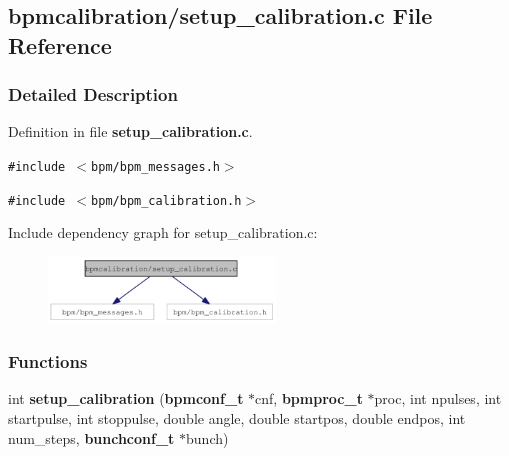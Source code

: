 \subsection{bpmcalibration/setup\_\-calibration.c File Reference}
\label{setup__calibration_8c}


\subsubsection{Detailed Description}


Definition in file {\bf setup\_\-calibration.c}.

{\tt \#include $<$bpm/bpm\_\-messages.h$>$}\par
{\tt \#include $<$bpm/bpm\_\-calibration.h$>$}\par


Include dependency graph for setup\_\-calibration.c:\nopagebreak
\begin{figure}[H]
\begin{center}
\leavevmode
\includegraphics[width=171pt]{setup__calibration_8c__incl}
\end{center}
\end{figure}
\subsubsection*{Functions}
\begin{CompactItemize}
\item 
int {\bf setup\_\-calibration} ({\bf bpmconf\_\-t} $\ast$cnf, {\bf bpmproc\_\-t} $\ast$proc, int npulses, int startpulse, int stoppulse, double angle, double startpos, double endpos, int num\_\-steps, {\bf bunchconf\_\-t} $\ast$bunch)
\end{CompactItemize}
